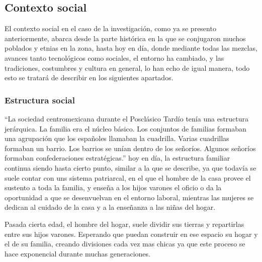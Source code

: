 \subsection{Contexto social}
El contexto social en el caso de la investigación, como ya se presento anteriormente, abarca desde la parte histórica en la que se conjugaron muchos poblados y etnias en la zona, hasta hoy en día, donde mediante todas las mezclas, avances tanto tecnológicos como sociales, el entorno ha cambiado, y las tradiciones, costumbres y cultura en general, lo han echo de igual manera, todo esto se tratará de describir en los siguientes apartados. 

\subsubsection{Estructura social}
``La sociedad centromexicana durante el Posclásico Tardío tenía una estructura jerárquica. La familia era el núcleo básico. Los conjuntos de familias formaban una agrupación que los españoles llamaban la cuadrilla. Varias cuadrillas formaban un barrio. Los barrios se unían dentro de los señoríos. Algunos señoríos formaban confederaciones estratégicas.'' \citep[p. 156]{Otomies} hoy en día, la estructura familiar continua siendo hasta cierto punto, similar a la que se describe, ya que todavía se suele contar con uns sistema patriarcal, en el que el hombre de la casa provee el sustento a toda la familia, y enseña a los hijos varones el oficio o da la oportunidad a que se desenvuelvan en el entorno laboral, mientras las mujeres se dedican al cuidado de la casa y a la enseñanza a las niñas del hogar.

Pasada cierta edad, el hombre del hogar, suele dividir sus tierras y repartirlas entre sus hijos varones. Esperando que puedan construir en ese espacio su hogar y el de su familia, creando divisiones cada vez mas chicas ya que este proceso se hace exponencial durante muchas generaciones.

